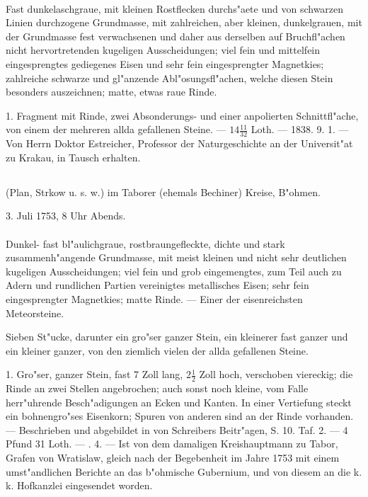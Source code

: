 \documentclass[a4paper, 11pt, oneside, polutonikogreek, german]{article}
\begin{document}
\paragraph{}
Fast dunkelaschgraue, mit kleinen Rostflecken durchs"aete und von schwarzen Linien durchzogene Grundmasse, mit zahlreichen, aber kleinen, dunkelgrauen, mit der Grundmasse fest verwachsenen und daher aus derselben auf Bruchfl"achen nicht hervortretenden kugeligen Ausscheidungen; viel fein und mittelfein eingesprengtes gediegenes Eisen und sehr fein eingesprengter Magnetkies; zahlreiche schwarze und gl"anzende Abl"osungsfl"achen, welche diesen Stein besonders auszeichnen; matte, etwas raue Rinde.

1. Fragment mit Rinde, zwei Absonderungs- und einer anpolierten Schnittfl"ache, von einem der mehreren allda gefallenen Steine. --- $\mathfrak{14\frac{11}{32}}$ Loth. --- 1838. 9. 1. --- Von Herrn Doktor Estreicher, Professor der Naturgeschichte an der Universit"at zu Krakau, in Tausch erhalten.
\subsection{}
\begin{center}

(Plan, Strkow u. s. w.) im Taborer (ehemals Bechiner) Kreise, B"ohmen.

3. Juli 1753, 8 Uhr Abends.
\end{center}
\paragraph{}
Dunkel- fast bl"aulichgraue, rostbraungefleckte, dichte und stark zusammenh"angende Grundmasse, mit meist kleinen und nicht sehr deutlichen kugeligen Ausscheidungen; viel fein und grob eingemengtes, zum Teil auch zu Adern und rundlichen Partien vereinigtes metallisches Eisen; sehr fein eingesprengter Magnetkies; matte Rinde. --- Einer der eisenreichsten Meteorsteine.

Sieben St"ucke, darunter ein gro"ser ganzer Stein, ein kleinerer fast ganzer und ein kleiner ganzer, von den ziemlich vielen der allda gefallenen Steine.

1. Gro"ser, ganzer Stein, fast 7 Zoll lang, $\mathfrak{2\frac{1}{2}}$ Zoll hoch, verschoben viereckig; die Rinde an zwei Stellen angebrochen; auch sonst noch kleine, vom Falle herr"uhrende Besch"adigungen an Ecken und Kanten. In einer Vertiefung steckt ein bohnengro"ses Eisenkorn; Spuren von anderen sind an der Rinde vorhanden. --- Beschrieben und abgebildet in von Schreibers Beitr"agen, S. 10. Taf. 2. --- 4 Pfund 31 Loth. --- . 4. --- Ist von dem damaligen Kreishauptmann zu Tabor, Grafen von Wratislaw, gleich nach der Begebenheit im Jahre 1753 mit einem umst"andlichen Berichte an das b"ohmische Gubernium, und von diesem an die k. k. Hofkanzlei eingesendet worden.
\end{document}
